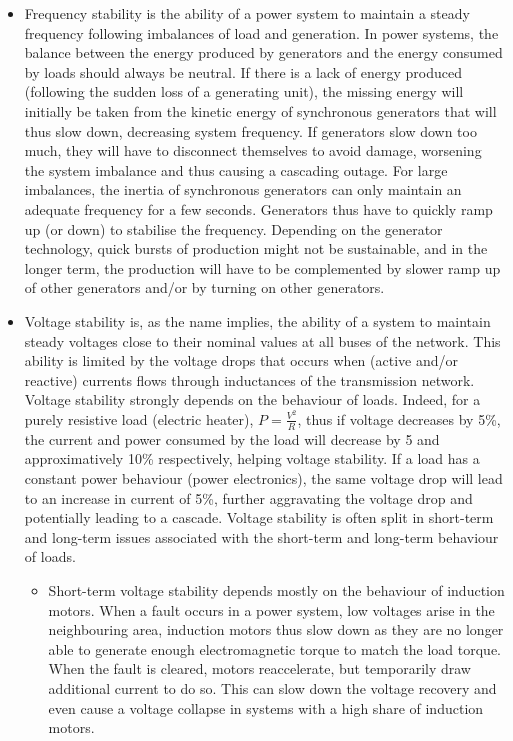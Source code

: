 \begin{itemize}
    \item Frequency stability is the ability of a power system to maintain a steady frequency following imbalances of load and generation. In power systems, the balance between the energy produced by generators and the energy consumed by loads should always be neutral. If there is a lack of energy produced (\eg following the sudden loss of a generating unit), the missing energy will initially be taken from the kinetic energy of synchronous generators that will thus slow down, decreasing system frequency. If generators slow down too much, they will have to disconnect themselves to avoid damage, worsening the system imbalance and thus causing a cascading outage. For large imbalances, the inertia of synchronous generators can only maintain an adequate frequency for a few seconds. Generators thus have to quickly ramp up (or down) to stabilise the frequency. Depending on the generator technology, quick bursts of production might not be sustainable, and in the longer term, the production will have to be complemented by slower ramp up of other generators and/or by turning on other generators.
    \item Voltage stability is, as the name implies, the ability of a system to maintain steady voltages close to their nominal values at all buses of the network. This ability is limited by the voltage drops that occurs when (active and/or reactive) currents flows through inductances of the transmission network. Voltage stability strongly depends on the behaviour of loads. Indeed, for a purely resistive load (\eg electric heater), \(P = \frac{V^2}{R}\), thus if voltage decreases by 5\%, the current and power consumed by the load will decrease by 5 and approximatively 10\% respectively, helping voltage stability. If a load has a constant power behaviour (\eg power electronics), the same voltage drop will lead to an increase in current of 5\%, further aggravating the voltage drop and potentially leading to a cascade. Voltage stability is often split in short-term and long-term issues associated with the short-term and long-term behaviour of loads.
    \begin{itemize}
        \item Short-term voltage stability depends mostly on the behaviour of induction motors. When a fault occurs in a power system, low voltages arise in the neighbouring area, induction motors thus slow down as they are no longer able to generate enough electromagnetic torque to match the load torque. When the fault is cleared, motors reaccelerate, but temporarily draw additional current to do so. This can slow down the voltage recovery and even cause a voltage collapse in systems with a high share of induction motors.

\end{itemize}
\end{itemize}
